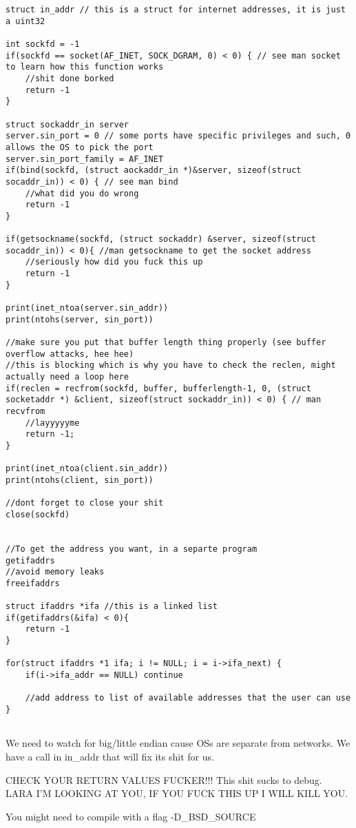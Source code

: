 \documentclass[12pt]{article}
\begin{document}
\begin{lstlisting}
struct in_addr // this is a struct for internet addresses, it is just a uint32

int sockfd = -1
if(sockfd == socket(AF_INET, SOCK_DGRAM, 0) < 0) { // see man socket to learn how this function works
	//shit done borked
	return -1
}

struct sockaddr_in server
server.sin_port = 0 // some ports have specific privileges and such, 0 allows the OS to pick the port
server.sin_port_family = AF_INET 
if(bind(sockfd, (struct aockaddr_in *)&server, sizeof(struct socaddr_in)) < 0) { // see man bind
	//what did you do wrong
	return -1
}

if(getsockname(sockfd, (struct sockaddr) &server, sizeof(struct socaddr_in)) < 0){ //man getsockname to get the socket address
	//seriously how did you fuck this up
	return -1
}

print(inet_ntoa(server.sin_addr))
print(ntohs(server, sin_port))

//make sure you put that buffer length thing properly (see buffer overflow attacks, hee hee)
//this is blocking which is why you have to check the reclen, might actually need a loop here
if(reclen = recfrom(sockfd, buffer, bufferlength-1, 0, (struct socketaddr *) &client, sizeof(struct sockaddr_in)) < 0) { // man recvfrom
	//layyyyyme
	return -1;
}

print(inet_ntoa(client.sin_addr))
print(ntohs(client, sin_port))

//dont forget to close your shit
close(sockfd)


//To get the address you want, in a separte program
getifaddrs
//avoid memory leaks
freeifaddrs

struct ifaddrs *ifa //this is a linked list
if(getifaddrs(&ifa) < 0){
	return -1
}

for(struct ifaddrs *1 ifa; i != NULL; i = i->ifa_next) {
	if(i->ifa_addr == NULL) continue 

	//add address to list of available addresses that the user can use
}


\end{lstlisting}


We need to watch for big/little endian cause OSs are separate from networks. We have a call in in\_addr that will fix its shit for us. 

CHECK YOUR RETURN VALUES FUCKER!!! This shit sucks to debug. LARA I'M LOOKING AT YOU, IF YOU FUCK THIS UP I WILL KILL YOU.

You might need to compile with a flag -D\_BSD\_SOURCE
\end{document}
